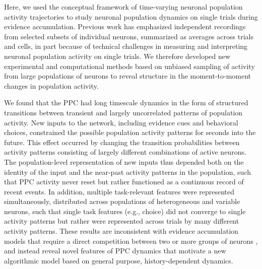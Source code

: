 \bigskip
Here, we used the conceptual framework of time-varying neuronal population activity trajectories to study neuronal population dynamics on single trials during evidence accumulation. Previous work has emphasized independent recordings from selected subsets of individual neurons, summarized as averages across trials and cells, in part because of technical challenges in measuring and interpreting neuronal population activity on single trials. We therefore developed new experimental and computational methods based on unbiased sampling of activity from large populations of neurons to reveal structure in the moment-to-moment changes in population activity.

\bigskip
We found that the PPC had long timescale dynamics in the form of structured transitions between transient and largely uncorrelated patterns of population activity. New inputs to the network, including evidence cues and behavioral choices, constrained the possible population activity patterns for seconds into the future. This effect occurred by changing the transition probabilities between activity patterns consisting of largely different combinations of active neurons. The population-level representation of new inputs thus depended both on the identity of the input and the near-past activity patterns in the population, such that PPC activity never reset but rather functioned as a continuous record of recent events. In addition, multiple task-relevant features were represented simultaneously, distributed across populations of heterogeneous and variable neurons, such that single task features (e.g., choice) did not converge to single activity patterns but rather were represented across trials by many different activity patterns. These results are inconsistent with evidence accumulation models that require a direct competition between two or more groups of neurons \citep{Wong:2006in, Machens:2005en, Wang:2002kn}, and instead reveal novel features of PPC dynamics that motivate a new algorithmic model based on general purpose, history-dependent dynamics.




